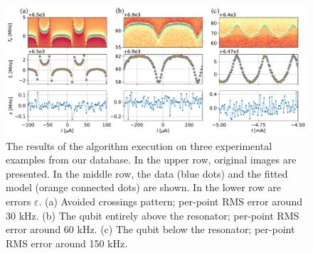 \documentclass[%
 aip,
 draft,
 amsmath,amssymb,
 reprint,%
]{revtex4-1}
\begin{document}
\begin{figure}
	\centering
	\includegraphics[width=\linewidth]{fit_cases}
	\caption{The results of the algorithm execution on three experimental examples from our database. In the upper row, original images are presented. In the middle row, the data  (blue dots) and the fitted model (orange connected dots) are shown. In the lower row are errors $\varepsilon$. (a) Avoided crossings pattern; per-point RMS error around 30 kHz. (b) The qubit entirely above the resonator; per-point RMS error around 60 kHz. (c) The qubit below the resonator; per-point RMS error around 150 kHz.}
	\label{fig:anti_fit_cases}
\end{figure}
\end{document}
